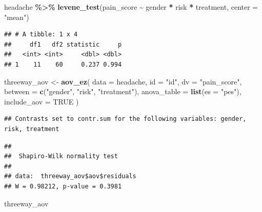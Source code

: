 \documentclass[
]{book}
\newenvironment{Shaded}{\begin{snugshade}}{\end{snugshade}}
\newcommand{\AttributeTok}[1]{\textcolor[rgb]{0.13,0.29,0.53}{#1}}
\newcommand{\ConstantTok}[1]{\textcolor[rgb]{0.56,0.35,0.01}{#1}}
\newcommand{\FunctionTok}[1]{\textcolor[rgb]{0.13,0.29,0.53}{\textbf{#1}}}
\newcommand{\NormalTok}[1]{#1}
\newcommand{\OtherTok}[1]{\textcolor[rgb]{0.56,0.35,0.01}{#1}}
\newcommand{\SpecialCharTok}[1]{\textcolor[rgb]{0.81,0.36,0.00}{\textbf{#1}}}
\newcommand{\StringTok}[1]{\textcolor[rgb]{0.31,0.60,0.02}{#1}}
\begin{document}
\begin{Shaded}
\begin{Highlighting}[]
\NormalTok{headache }\SpecialCharTok{\%\textgreater{}\%}
  \FunctionTok{levene\_test}\NormalTok{(pain\_score }\SpecialCharTok{\textasciitilde{}}\NormalTok{ gender }\SpecialCharTok{*}\NormalTok{ risk }\SpecialCharTok{*}\NormalTok{ treatment, }\AttributeTok{center =} \StringTok{"mean"}\NormalTok{)}
\end{Highlighting}
\end{Shaded}

\begin{verbatim}
## # A tibble: 1 x 4
##     df1   df2 statistic     p
##   <int> <int>     <dbl> <dbl>
## 1    11    60     0.237 0.994
\end{verbatim}

\begin{Shaded}
\begin{Highlighting}[]
\NormalTok{threeway\_aov }\OtherTok{\textless{}{-}} \FunctionTok{aov\_ez}\NormalTok{(}
  \AttributeTok{data =}\NormalTok{ headache,}
  \AttributeTok{id =} \StringTok{"id"}\NormalTok{,}
  \AttributeTok{dv =} \StringTok{"pain\_score"}\NormalTok{,}
  \AttributeTok{between =} \FunctionTok{c}\NormalTok{(}\StringTok{"gender"}\NormalTok{, }\StringTok{"risk"}\NormalTok{, }\StringTok{"treatment"}\NormalTok{),}
  \AttributeTok{anova\_table =} \FunctionTok{list}\NormalTok{(}\AttributeTok{es =} \StringTok{"pes"}\NormalTok{),}
  \AttributeTok{include\_aov =} \ConstantTok{TRUE}
\NormalTok{)}
\end{Highlighting}
\end{Shaded}

\begin{verbatim}
## Contrasts set to contr.sum for the following variables: gender, risk, treatment
\end{verbatim}

\begin{Shaded}
\end{Shaded}

\begin{verbatim}
## 
##  Shapiro-Wilk normality test
## 
## data:  threeway_aov$aov$residuals
## W = 0.98212, p-value = 0.3981
\end{verbatim}

\begin{Shaded}
\begin{Highlighting}[]
\NormalTok{threeway\_aov}
\end{Highlighting}
\end{Shaded}
\end{document}
